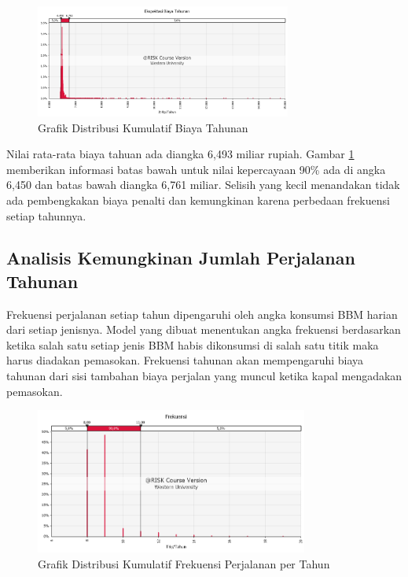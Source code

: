 \begin{figure}[htbp!]
    \centering
    \includegraphics[width=0.75\textwidth]{gambar/annual-cost-expectation-dist.png}
    \caption{Grafik Distribusi Kumulatif Biaya Tahunan}
    \label{fig:annual-cost-dist}
\end{figure}

Nilai rata-rata biaya tahuan ada diangka 6,493 miliar rupiah. Gambar \ref{fig:annual-cost-dist} memberikan informasi batas bawah untuk nilai kepercayaan 90\% ada di angka 6,450 dan batas bawah diangka 6,761 miliar. Selisih yang kecil menandakan tidak ada pembengkakan biaya penalti dan kemungkinan karena perbedaan frekuensi setiap tahunnya.


\subsection{Analisis Kemungkinan Jumlah Perjalanan Tahunan}
\label{subsec:annual-freq-dist}

Frekuensi perjalanan setiap tahun dipengaruhi oleh angka konsumsi BBM harian dari setiap jenisnya. Model yang dibuat menentukan angka frekuensi berdasarkan ketika salah satu setiap jenis BBM habis dikonsumsi di salah satu titik maka harus diadakan pemasokan. Frekuensi tahunan akan mempengaruhi biaya tahunan dari sisi tambahan biaya perjalan yang muncul ketika kapal mengadakan pemasokan.

\begin{figure}[htbp!]
    \centering
    \includegraphics[width=0.8\textwidth]{gambar/annual-trip-freq.png}
    \caption{Grafik Distribusi Kumulatif Frekuensi Perjalanan per Tahun}
    \label{fig:annual-tripFreq-dist}
\end{figure}

